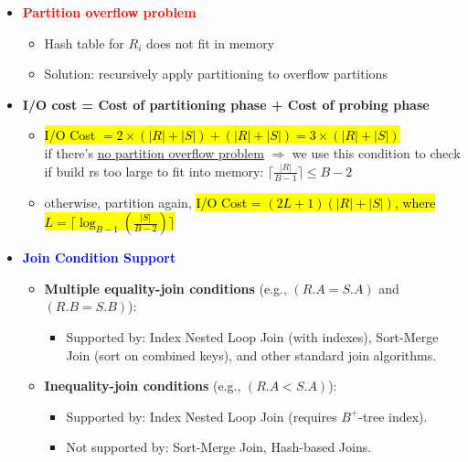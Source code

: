 \documentclass[10pt,landscape]{article}
\newcommand{\1}{\mathmybb{1}}
\begin{document}
\begin{multicols*}{3}
\begin{itemize}
\begin{itemize}
        \item \textbf{\textcolor{red}{Partition overflow problem}}
        \begin{itemize}
            \item Hash table for $R_i$ does not fit in memory
            \item Solution: recursively apply partitioning to overflow partitions
        \end{itemize}
    
        \item \textbf{I/O cost = Cost of partitioning phase + Cost of probing phase}
        \begin{itemize}
            \item \hl{I/O Cost $= 2 \times (|R| + |S|) + (|R| + |S|) = 3 \times (|R| + |S|)$} \\
            if there’s \underline{no partition overflow problem} $\Rightarrow$ we use this condition to check if build rs too large to fit into memory: $\lceil \frac{|R|}{B-1} \rceil \leq B-2$
            \item otherwise, partition again, \hl{I/O Cost = $(2L + 1)(|R| + |S|)$, where $L = \lceil \log_{B-1} (\frac{|S|}{B-2}) \rceil$}
        \end{itemize}
    
        \item \textbf{\textcolor{blue}{Join Condition Support}}
        \begin{itemize}
            \item \textbf{Multiple equality-join conditions} (e.g., $(R.A = S.A)$ and $(R.B = S.B)$):
            \begin{itemize}
                \item Supported by: Index Nested Loop Join (with indexes), Sort-Merge Join (sort on combined keys), and other standard join algorithms.
            \end{itemize}
            \item \textbf{Inequality-join conditions} (e.g., $(R.A < S.A)$):
            \begin{itemize}
                \item Supported by: Index Nested Loop Join (requires $B^+$-tree index).
                \item Not supported by: Sort-Merge Join, Hash-based Joins.
            \end{itemize}
        \end{itemize}
    \end{itemize}
\end{itemize}


\end{multicols*}
\end{document}
